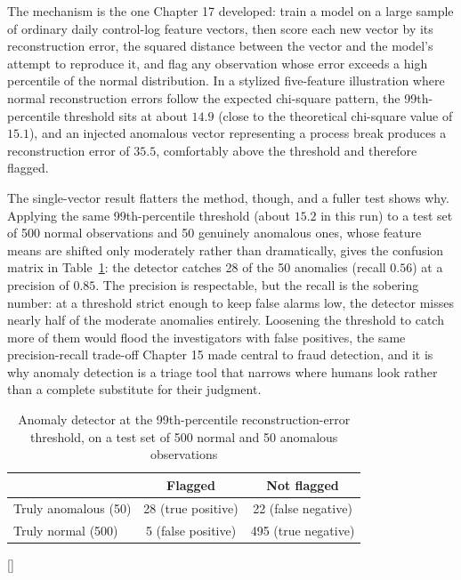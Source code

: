 \documentclass[../ai_in_finance]{subfiles}
\begin{document}
The mechanism is the one Chapter 17 developed: train a model on a large sample of ordinary daily control-log feature vectors, then score each new vector by its reconstruction error, the squared distance between the vector and the model's attempt to reproduce it, and flag any observation whose error exceeds a high percentile of the normal distribution. In a stylized five-feature illustration where normal reconstruction errors follow the expected chi-square pattern, the 99th-percentile threshold sits at about $14.9$ (close to the theoretical chi-square value of $15.1$), and an injected anomalous vector representing a process break produces a reconstruction error of $35.5$, comfortably above the threshold and therefore flagged.

The single-vector result flatters the method, though, and a fuller test shows why. Applying the same 99th-percentile threshold (about $15.2$ in this run) to a test set of 500 normal observations and 50 genuinely anomalous ones, whose feature means are shifted only moderately rather than dramatically, gives the confusion matrix in Table~\ref{tab:oprisk-anomaly}: the detector catches 28 of the 50 anomalies (recall $0.56$) at a precision of $0.85$. The precision is respectable, but the recall is the sobering number: at a threshold strict enough to keep false alarms low, the detector misses nearly half of the moderate anomalies entirely. Loosening the threshold to catch more of them would flood the investigators with false positives, the same precision-recall trade-off Chapter 15 made central to fraud detection, and it is why anomaly detection is a triage tool that narrows where humans look rather than a complete substitute for their judgment.

\begin{table}[htbp]
\centering
\begin{lrbox}{\bookmeasuredbox}
\begin{tabular}{lcc}
\toprule
 & Flagged & Not flagged \\
\midrule
Truly anomalous (50) & 28 (true positive) & 22 (false negative) \\
Truly normal (500) & 5 (false positive) & 495 (true negative) \\
\bottomrule
\end{tabular}
\end{lrbox}
\ifdim\wd\bookmeasuredbox<0.65\linewidth
\setlength{\bookcapwidth}{0.65\linewidth}
\else
\setlength{\bookcapwidth}{\wd\bookmeasuredbox}
\fi
{}[\bookcapwidth]{
\usebox{\bookmeasuredbox}
}{
\caption{Anomaly detector at the 99th-percentile reconstruction-error threshold, on a test set of 500 normal and 50 anomalous observations}
\label{tab:oprisk-anomaly}
}
\end{table}
\end{document}
